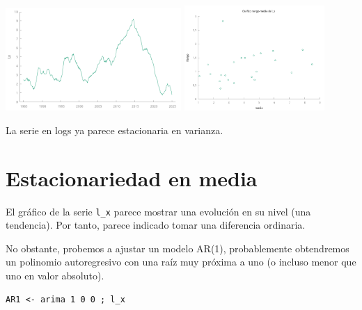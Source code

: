 \documentclass[10pt]{article}
\begin{document}
\begin{center}
\includegraphics[width=0.5\textwidth]{./EjercicioIdentificacionARIMA/SerieEnLogs.png}
\includegraphics[width=0.4\textwidth]{./EjercicioIdentificacionARIMA/rango-media-enLogs.png} 
\end{center}

La serie en logs ya parece estacionaria en varianza.
\section*{Estacionariedad en media}
\label{sec:org8d2b32f}

El gráfico de la serie \texttt{l\_x} parece mostrar una evolución en su nivel
(una tendencia). Por tanto, parece indicado tomar una diferencia
ordinaria.

No obstante, probemos a ajustar un modelo AR(1), probablemente
obtendremos un polinomio autoregresivo con una raíz muy próxima a uno
(o incluso menor que uno en valor absoluto). 

\begin{verbatim}
AR1 <- arima 1 0 0 ; l_x
\end{verbatim}
\end{document}

